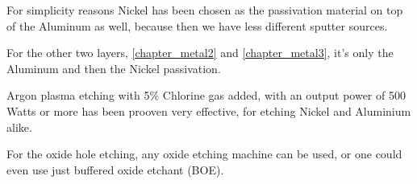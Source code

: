 For simplicity reasons Nickel has been chosen as the passivation material on top of the Aluminum as well, because then we have less different sputter sources.

For the other two layers, \autoref{chapter_metal2} and \autoref{chapter_metal3}, it's only the Aluminum and then the Nickel passivation.

Argon plasma etching with 5\% Chlorine gas added, with an output power of 500 Watts or more has been prooven very effective, for etching Nickel and Aluminium alike.

For the oxide hole etching, any oxide etching machine can be used, or one could even use just buffered oxide etchant (BOE).

\newpage




\newpage




\newpage




\newpage



